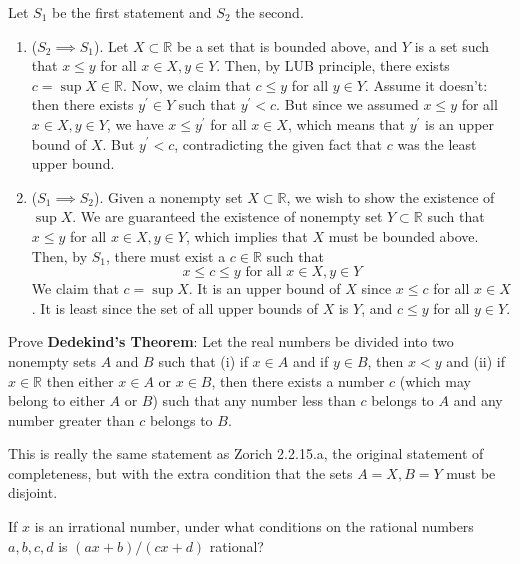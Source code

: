 \documentclass{article}
\begin{document}
    \begin{solution}
    Let $S_1$ be the first statement and $S_2$ the second. 
    \begin{enumerate}
        \item ($S_2 \implies S_1$). Let $X \subset \mathbb{R}$ be a set that is bounded above, and $Y$ is a set such that $x \leq y$ for all $x \in X, y \in Y$. Then, by LUB principle, there exists $c = \sup{X} \in \mathbb{R}$. Now, we claim that $c \leq y$ for all $y \in Y$. Assume it doesn't: then there exists $y^\prime \in Y$ such that $y^\prime < c$. But since we assumed $x \leq y$ for all $x \in X, y \in Y$, we have $x \leq y^\prime$ for all $x \in X$, which means that $y^\prime$ is an upper bound of $X$. But $y^\prime < c$, contradicting the given fact that $c$ was the least upper bound. 
        \item ($S_1 \implies S_2$). Given a nonempty set $X \subset \mathbb{R}$, we wish to show the existence of $\sup{X}$. We are guaranteed the existence of nonempty set $Y \subset \mathbb{R}$ such that $x \leq y$ for all $x \in X, y \in Y$, which implies that $X$ must be bounded above. Then, by $S_1$, there must exist a $c \in \mathbb{R}$ such that 
        \[x \leq c \leq y \text{ for all } x \in X, y \in Y\]
        We claim that $c = \sup{X}$. It is an upper bound of $X$ since $x \leq c$ for all $x \in X$. It is least since the set of all upper bounds of $X$ is $Y$, and $c \leq y$ for all $y \in Y$. 
    \end{enumerate}
    \end{solution}

    \begin{exercise}[Olmsted 1.15]
    Prove \textbf{Dedekind's Theorem}: Let the real numbers be divided into two nonempty sets $A$ and $B$ such that (i) if $x \in A$ and if $y \in B$, then $x < y$ and (ii) if $x \in \mathbb{R}$ then either $x \in A$ or $x \in B$, then there exists a number $c$ (which may belong to either $A$ or $B$) such that any number less than $c$ belongs to $A$ and any number greater than $c$ belongs to $B$. 
    \end{exercise}

    \begin{solution}
    This is really the same statement as Zorich 2.2.15.a, the original statement of completeness, but with the extra condition that the sets $A = X, B = Y$ must be disjoint.
    \end{solution}

    \begin{exercise}[Olmsted 1.7]
    If $x$ is an irrational number, under what conditions on the rational numbers $a, b, c, d$ is $(ax + b)/(cx + d)$ rational? 
    \end{exercise}
\end{document}
